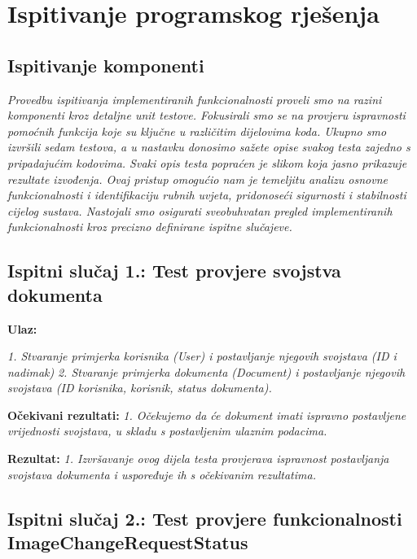 	
		\section{Ispitivanje programskog rješenja}
			

			
			\subsection{Ispitivanje komponenti}

			 \textit{Provedbu ispitivanja implementiranih funkcionalnosti proveli smo na razini komponenti kroz detaljne unit testove. Fokusirali smo se na provjeru ispravnosti pomoćnih funkcija koje su ključne u različitim dijelovima koda. Ukupno smo izvršili sedam testova, a u nastavku donosimo sažete opise svakog testa zajedno s pripadajućim kodovima. Svaki opis testa popraćen je slikom koja jasno prikazuje rezultate izvođenja. Ovaj pristup omogućio nam je temeljitu analizu osnovne funkcionalnosti i identifikaciju rubnih uvjeta, pridonoseći sigurnosti i stabilnosti cijelog sustava. Nastojali smo osigurati sveobuhvatan pregled implementiranih funkcionalnosti kroz precizno definirane ispitne slučajeve.}


            \subsection{Ispitni slučaj 1.: Test provjere svojstva dokumenta}

                        \textbf{Ulaz:}

                        \textit{1. Stvaranje primjerka korisnika (User) i postavljanje njegovih svojstava (ID i nadimak)}
                        \textit{2. Stvaranje primjerka dokumenta (Document) i postavljanje njegovih svojstava (ID korisnika, korisnik, status dokumenta).}

                        \textbf{Očekivani rezultati:}
                        \textit{1. Očekujemo da će dokument imati ispravno postavljene vrijednosti svojstava, u skladu s postavljenim ulaznim podacima.}

                        \textbf{Rezultat:}
                        \textit{1. Izvršavanje ovog dijela testa provjerava ispravnost postavljanja svojstava dokumenta i uspoređuje ih s očekivanim rezultatima.}

            \subsection{Ispitni slučaj 2.: Test provjere funkcionalnosti ImageChangeRequestStatus}

